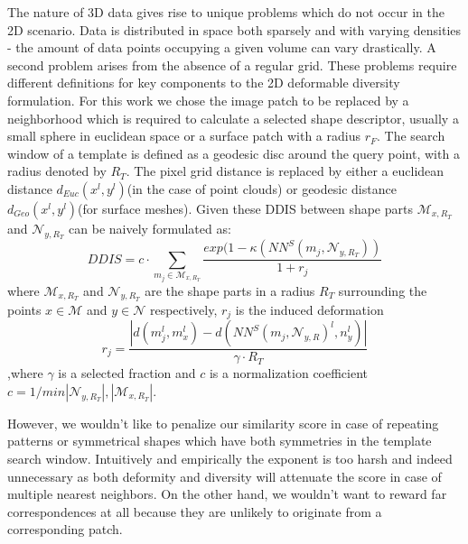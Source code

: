 \documentclass[10pt,twocolumn,letterpaper]{article}
\begin{document}
The nature of 3D data gives rise to unique problems which do not occur in the 2D scenario. Data is distributed in space both sparsely and with varying densities - the amount of data points occupying a given volume can vary drastically.
A second problem arises from the absence of a regular grid. These problems require different definitions for key components to the 2D deformable diversity formulation. For this work we chose the image patch to be replaced by a neighborhood which is required to calculate a selected shape descriptor, usually a small sphere in euclidean space or a surface patch with a radius $r_F$. 
The search window  of a template is defined as a geodesic disc around the query point, with a radius denoted by $R_T$. The pixel grid distance is replaced by either a euclidean distance $d_{Euc}(x^l,y^l)$(in the case of point clouds) or geodesic distance $d_{Geo}(x^l,y^l)$(for surface meshes).
Given these DDIS  between shape parts $\mathcal{M}_{x,R_T}$ and $\mathcal{N}_{y,R_T}$ can be naively formulated as:
\begin{equation}
DDIS=c\cdot\sum_{m_j\in\mathcal{M}_{x,R_T}}\frac{exp(1-\kappa(NN^S(m_j,\mathcal{N}_{y,R_T}))}{1+r_j}
\end{equation}
where $\mathcal{M}_{x,R_T}$ and $\mathcal{N}_{y,R_T}$ are the shape parts in a radius $R_T$ surrounding the points $x\in \mathcal{M}$ and $y \in \mathcal{N}$ respectively, $r_j$ is the induced deformation
\begin{equation} 
r_j=\frac{|d(m_j^l,m_x^l)-d(NN^S(m_j,\mathcal{N}_{y,R})^l,n_y^l)|}{\gamma\cdot R_T}
\end{equation}
,where $\gamma$ is a selected fraction and $c$ is a normalization coefficient $c=1/min{|\mathcal{N}_{y,R_T}|,|\mathcal{M}_{x,R_T}|}$.

However, we wouldn't like to penalize our similarity score in case of repeating patterns or symmetrical shapes which have both symmetries in the template search window. Intuitively and empirically the exponent is too harsh and indeed unnecessary as both deformity and diversity will attenuate the score in case of multiple nearest neighbors. On the other hand, we wouldn't want to reward far correspondences at all because they are unlikely to originate from a corresponding patch. 
\end{document}
